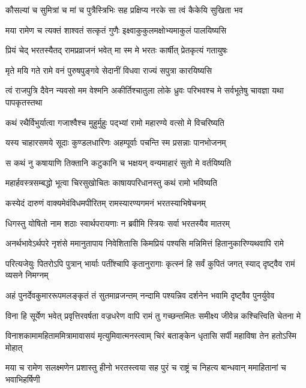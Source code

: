 \twolineshloka
{कौसल्यां च सुमित्रां च मां च पुत्रैस्त्रिभिः सह}
{प्रक्षिप्य नरके सा त्वं कैकेयि सुखिता भव} %

\twolineshloka
{मया रामेण च त्यक्तं शाश्वतं सत्कृतं गुणैः}
{इक्ष्वाकुकुलमक्षोभ्यमाकुलं पालयिष्यसि} %

\twolineshloka
{प्रियं चेद् भरतस्यैतद् रामप्रव्राजनं भवेत्}
{मा स्म मे भरतः कार्षीत् प्रेतकृत्यं गतायुषः} %

\twolineshloka
{मृते मयि गते रामे वनं पुरुषपुङ्गवे}
{सेदानीं विधवा राज्यं सपुत्रा कारयिष्यसि} %

\threelineshloka
{त्वं राजपुत्रि दैवेन न्यवसो मम वेश्मनि}
{अकीर्तिश्चातुला लोके ध्रुवः परिभवश्च मे}
{सर्वभूतेषु चावज्ञा यथा पापकृतस्तथा} %

\twolineshloka
{कथं रथैर्विभुर्यात्वा गजाश्वैश्च मुहुर्मुहुः}
{पद्भ्यां रामो महारण्ये वत्सो मे विचरिष्यति} %

\twolineshloka
{यस्य चाहारसमये सूदाः कुण्डलधारिणः}
{अहम्पूर्वाः पचन्ति स्म प्रसन्नाः पानभोजनम्} %

\twolineshloka
{स कथं नु कषायाणि तिक्तानि कटुकानि च}
{भक्षयन् वन्यमाहारं सुतो मे वर्तयिष्यति} %

\twolineshloka
{महार्हवस्त्रसम्बद्धो भूत्वा चिरसुखोचितः}
{काषायपरिधानस्तु कथं रामो भविष्यति} %

\twolineshloka
{कस्येदं दारुणं वाक्यमेवंविधमपीरितम्}
{रामस्यारण्यगमनं भरतस्याभिषेचनम्} %

\twolineshloka
{धिगस्तु योषितो नाम शठाः स्वार्थपरायणाः}
{न ब्रवीमि स्त्रियः सर्वा भरतस्यैव मातरम्} %

\twolineshloka
{अनर्थभावेऽर्थपरे नृशंसे ममानुतापाय निवेशितासि}
{किमप्रियं पश्यसि मन्निमित्तं हितानुकारिण्यथवापि रामे} %

\twolineshloka
{परित्यजेयुः पितरोऽपि पुत्रान् भार्याः पतींश्चापि कृतानुरागाः}
{कृत्स्नं हि सर्वं कुपितं जगत् स्याद् दृष्ट्वैव रामं व्यसने निमग्नम्} %

\twolineshloka
{अहं पुनर्देवकुमाररूपमलङ्कृतं तं सुतमाव्रजन्तम्}
{नन्दामि पश्यन्निव दर्शनेन भवामि दृष्ट्वैव पुनर्युवेव} %

\twolineshloka
{विना हि सूर्येण भवेत् प्रवृत्तिरवर्षता वज्रधरेण वापि}
{रामं तु गच्छन्तमितः समीक्ष्य जीवेन्न कश्चित्त्विति चेतना मे} %

\twolineshloka
{विनाशकामामहिताममित्रामावासयं मृत्युमिवात्मनस्त्वाम्}
{चिरं बताङ्केन धृतासि सर्पी महाविषा तेन हतोऽस्मि मोहात्} %

\twolineshloka
{मया च रामेण सलक्ष्मणेन प्रशास्तु हीनो भरतस्त्वया सह}
{पुरं च राष्ट्रं च निहत्य बान्धवान् ममाहितानां च भवाभिहर्षिणी} %

